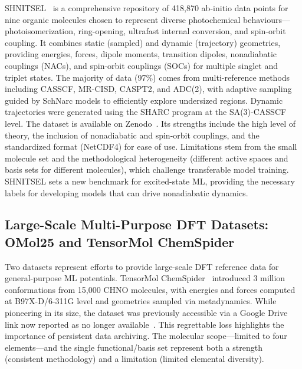 \documentclass[12pt]{article}
\begin{document}
SHNITSEL~\cite{ds46-1} is a comprehensive repository of 418,870 ab-initio data points for nine organic molecules chosen to represent diverse photochemical behaviours—photoisomerization, ring-opening, ultrafast internal conversion, and spin-orbit coupling. It combines static (sampled) and dynamic (trajectory) geometries, providing energies, forces, dipole moments, transition dipoles, nonadiabatic couplings (NACs), and spin-orbit couplings (SOCs) for multiple singlet and triplet states. The majority of data (97\%) comes from multi-reference methods including CASSCF, MR-CISD, CASPT2, and ADC(2), with adaptive sampling guided by SchNarc models to efficiently explore undersized regions. Dynamic trajectories were generated using the SHARC program at the SA(3)-CASSCF level. The dataset is available on Zenodo~\cite{ds46-2}. Its strengths include the high level of theory, the inclusion of nonadiabatic and spin-orbit couplings, and the standardized format (NetCDF4) for ease of use. Limitations stem from the small molecule set and the methodological heterogeneity (different active spaces and basis sets for different molecules), which challenge transferable model training. SHNITSEL sets a new benchmark for excited-state ML, providing the necessary labels for developing models that can drive nonadiabatic dynamics.

\subsection{Large-Scale Multi-Purpose DFT Datasets: OMol25 and TensorMol ChemSpider}

Two datasets represent efforts to provide large-scale DFT reference data for general-purpose ML potentials. TensorMol ChemSpider~\cite{ds44-45} introduced 3 million conformations from 15,000 CHNO molecules, with energies and forces computed at B97X-D/6-311G level and geometries sampled via metadynamics. While pioneering in its size, the dataset was previously accessible via a Google Drive link now reported as no longer available~\cite{ds44-191}. This regrettable loss highlights the importance of persistent data archiving. The molecular scope—limited to four elements—and the single functional/basis set represent both a strength (consistent methodology) and a limitation (limited elemental diversity).
\end{document}
